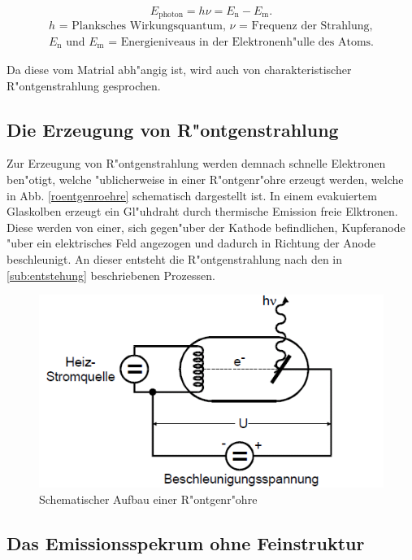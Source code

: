 		\begin{equation}
			E_{\text{photon}} = h \nu = E_\mathrm{n} - E_\mathrm{m}. \label{gleich_1}
		\end{equation}
		\begin{eqnarray*}
			\text{$h$ = Planksches Wirkungsquantum, $\nu$ = Frequenz der Strahlung,}\\
			\text{$E_\mathrm{n}$ und $E_\mathrm{m}$ = Energieniveaus in der Elektronenh"ulle des Atoms.}
		\end{eqnarray*}
	
		{Da diese vom Matrial abh"angig ist, wird auch von charakteristischer R"ontgenstrahlung gesprochen.}
		
	\subsection{Die Erzeugung von R"ontgenstrahlung}
	\label{sub:erzeugung}

		Zur Erzeugung von R"ontgenstrahlung werden demnach schnelle Elektronen ben"otigt, welche "ublicherweise in einer R"ontgenr"ohre erzeugt werden, welche in Abb. \eqref{roentgenroehre} schematisch dargestellt ist.
		In einem evakuiertem Glaskolben erzeugt ein Gl"uhdraht durch thermische Emission freie Elktronen. 
		Diese werden von einer, sich gegen"uber der Kathode be\-find\-lich\-en, Kupferanode "uber ein elektrisches Feld angezogen und dadurch in Richtung der Anode beschleunigt.
		An dieser entsteht die R"ontgenstrahlung nach den in \eqref{sub:entstehung} beschriebenen Prozessen.

		\begin{figure}[htbp]
			\centering
			\includegraphics[width = 12cm]{img/Roentgenroehre.png}
			\caption{Schematischer Aufbau einer R"ontgenr"ohre}
			\label{roentgenroehre}
		\end{figure}

	\subsection{Das Emissionsspekrum ohne Feinstruktur}
	\label{sub:ohnefein}

